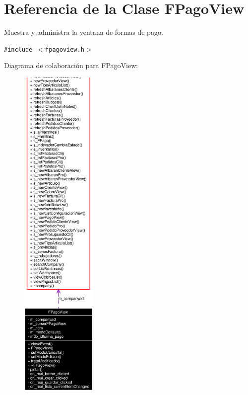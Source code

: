 \section{Referencia de la Clase FPago\-View}
\label{classFPagoView}
Muestra y administra la ventana de formas de pago.  


{\tt \#include $<$fpagoview.h$>$}

Diagrama de colaboraci\'{o}n para FPago\-View:\begin{figure}[H]
\begin{center}
\leavevmode
\includegraphics[width=105pt]{classFPagoView__coll__graph}
\end{center}
\end{figure}
